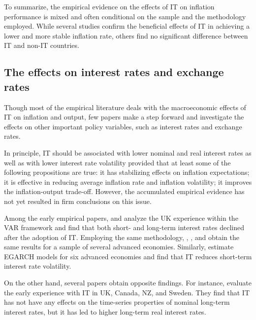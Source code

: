 \documentclass{article}
\begin{document}
To summarize, the empirical evidence on the effects of IT on inflation performance is mixed and often conditional on the sample and the methodology employed. While several studies confirm the beneficial effects of IT in achieving a lower and more stable inflation rate, others find no significant difference between IT and non-IT countries.

\subsection{The effects on interest rates and exchange rates}

Though most of the empirical literature deals with the macroeconomic effects of IT on inflation and output, few papers make a step forward and investigate the effects on other important policy variables, such as interest rates and exchange rates.

In principle, IT should be associated with lower nominal and real interest rates as well as with lower interest rate volatility provided that at least some of the following propositions are true: it has stabilizing effects on inflation expectations; it is effective in reducing average inflation rate and inflation volatility; it improves the inflation-output trade-off. However, the accumulated empirical evidence has not yet resulted in firm conclusions on this issue.

Among the early empirical papers, \citet{huh1996} and \citet{lane1998} analyze the UK experience within the VAR framework and find that both short- and long-term interest rates declined after the adoption of IT. Employing the same methodology, \citet{laubach1997}, \citet{mishkin1997}, and \citet{neumann2002} obtain the same results for a sample of several advanced economies. Similarly, \citet{almeida1998} estimate EGARCH models for six advanced economies and find that IT reduces short-term interest rate volatility.

On the other hand, several papers obtain opposite findings. For instance, \citet{freeman1995} evaluate the early experience with IT in UK, Canada, NZ, and Sweden. They find that IT has not have any effects on the time-series properties of nominal long-term interest rates, but it has led to higher long-term real interest rates.
\end{document}
